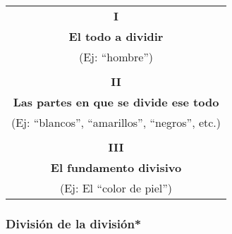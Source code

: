 \documentclass{article}
\begin{document}
\begin{center}
\begin{tabular}{ |c| } 
    \hline
    \textbf{I} \\
    \textbf{El todo a dividir} \\
    (Ej: ``hombre'') \\ \\
        
    \textbf{II} \\
    \textbf{Las partes en que se divide ese todo} \\
    (Ej: ``blancos'', ``amarillos'', ``negros'', etc.) \\ \\
        
    \textbf{III} \\
    \textbf{El fundamento divisivo} \\
    (Ej: El ``color de piel'') \\
    \hline
\end{tabular}
\end{center}
    
\subsubsection{División de la división*} 
    
\end{document}
